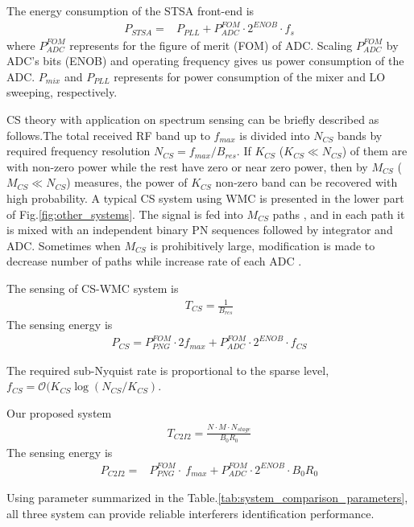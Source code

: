 \documentclass{IEEEtran}
\begin{document}
The energy consumption of the STSA front-end is
\begin{align}
P_{STSA}= &P_{PLL}+P_{ADC}^{FOM}\cdot 2^{ENOB}\cdot f_s 
\end{align}
where $P_{ADC}^{FOM}$ represents for the figure of merit (FOM) of ADC. Scaling $P_{ADC}^{FOM}$ by ADC's bits (ENOB) and operating frequency gives us power consumption of the ADC. $P_{mix}$ and $P_{PLL}$ represents for power consumption of the mixer and LO sweeping, respectively.



CS theory with application on spectrum sensing can be briefly described as follows.The total received RF band up to $f_{max}$ is divided into $N_{CS}$ bands by required frequency resolution $N_{CS} = f_{max}/B_{res}$. If $K_{CS}$ ($K_{CS}\ll N_{CS}$) of them are with non-zero power while the rest have zero or near zero power, then by $M_{CS}$ ($M_{CS} \ll N_{CS}$) measures, the power of $K_{CS}$ non-zero band can be recovered with high probability. A typical CS system using WMC is presented in the lower part of Fig.\ref{fig:other_systems}. The signal is fed into $M_{CS}$ paths , and in each path it is mixed with an independent binary PN sequences followed by integrator and ADC. Sometimes when $M_{CS}$ is prohibitively large, modification is made to decrease number of paths while increase rate of each ADC \cite{5678599}.

The sensing of CS-WMC system is
\begin{align}
T_{CS} = \frac{1}{B_{res}}
\end{align}
The sensing energy is
\begin{align}
P_{CS}= P_{PNG}^{FOM}\cdot 2f_{max}+P_{ADC}^{FOM}\cdot 2^{ENOB}\cdot f_{CS} 
\end{align}

The required sub-Nyquist rate is proportional to the sparse level, $f_{CS} = \mathcal{O}(K_{CS}\log(N_{CS}/K_{CS})$.
 


Our proposed system 
\begin{align}
T_{C2I2} = \frac{ N\cdot M \cdot N_{stage}}{B_0R_0}
\end{align}
The sensing energy is
\begin{align}
P_{C2I2}= &P_{PNG}^{FOM}\cdot\ f_{max}+P_{ADC}^{FOM}\cdot 2^{ENOB}\cdot B_0R_0
\end{align}

Using parameter summarized in the Table.\ref{tab:system_comparison_parameters}, all three system can provide reliable interferers identification performance.
\end{document}
